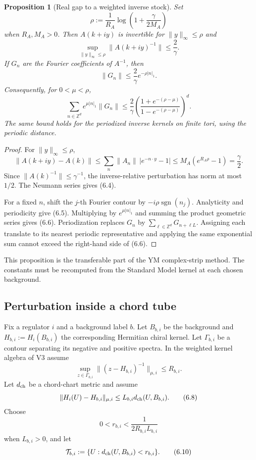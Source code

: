 \documentclass[11pt]{article}
\newtheorem{proposition}[theorem]{Proposition}
\newcommand{\sgn}{\operatorname{sgn}}
\begin{document}
\begin{proposition}[Real gap to a weighted inverse stock]
\label{prop:v11v6-strip-stock}
Set
\[
 \rho:=
 \frac1{R_A}\log\left(1+\frac{\gamma}{2M_A}\right)
 \tag{6.3}
\]
when \(R_A,M_A>0\).  Then \(A(k+iy)\) is invertible for
\(\|y\|_\infty\leq\rho\) and
\[
 \sup_{\|y\|_\infty\leq\rho}
 \|A(k+iy)^{-1}\|\leq\frac2\gamma.
 \tag{6.4}
\]
If \(G_n\) are the Fourier coefficients of \(A^{-1}\), then
\[
 \|G_n\|\leq\frac2\gamma e^{-\rho|n|_1}.
 \tag{6.5}
\]
Consequently, for \(0<\mu<\rho\),
\[
 \sum_{n\in\mathbb Z^d}e^{\mu|n|_1}\|G_n\|
 \leq
 \frac2\gamma
 \left(
 \frac{1+e^{-(\rho-\mu)}}{1-e^{-(\rho-\mu)}}
 \right)^d.
 \tag{6.6}
\]
The same bound holds for the periodized inverse kernels on finite tori,
using the periodic distance.
\end{proposition}

\begin{proof}
For \(\|y\|_\infty\leq\rho\),
\[
 \|A(k+iy)-A(k)\|
 \leq
 \sum_n\|A_n\|\,|e^{-n\cdot y}-1|
 \leq M_A(e^{R_A\rho}-1)=\frac\gamma2.
\]
Since \(\|A(k)^{-1}\|\leq\gamma^{-1}\), the inverse-relative
perturbation has norm at most \(1/2\).  The Neumann series gives (6.4).

For a fixed \(n\), shift the \(j\)-th Fourier contour by
\(-i\rho\sgn(n_j)\).  Analyticity and periodicity give (6.5).
Multiplying by \(e^{\mu|n|_1}\) and summing the product geometric series
gives (6.6).  Periodization replaces \(G_n\) by
\(\sum_{\ell\in\mathbb Z^d}G_{n+\ell L}\).  Assigning each translate to
its nearest periodic representative and applying the same exponential
sum cannot exceed the right-hand side of (6.6).
\end{proof}

This proposition is the transferable part of the YM complex-strip method.
The constants must be recomputed from the Standard Model kernel at each
chosen background.

\subsection{Perturbation inside a chord tube}

Fix a regulator \(i\) and a background label \(b\).  Let \(B_{b,i}\) be
the background and \(H_{b,i}:=H_i(B_{b,i})\) the corresponding Hermitian
chiral kernel.  Let \(\Gamma_{b,i}\) be a contour separating its negative
and positive spectra.  In the weighted kernel algebra of V3 assume
\[
 \sup_{z\in\Gamma_{b,i}}
 \|(z-H_{b,i})^{-1}\|_{\mu,i}\leq R_{b,i}.
 \tag{6.7}
\]
Let \(d_{\rm ch}\) be a chord-chart metric and assume
\[
 \|H_i(U)-H_{b,i}\|_{\mu,i}
 \leq L_{b,i}d_{\rm ch}(U,B_{b,i}).
 \tag{6.8}
\]
Choose
\[
 0<r_{b,i}<\frac1{2R_{b,i}L_{b,i}}
 \tag{6.9}
\]
when \(L_{b,i}>0\), and let
\[
 \mathcal T_{b,i}:=
 \{U:d_{\rm ch}(U,B_{b,i})<r_{b,i}\}.
 \tag{6.10}
\]
\end{document}
